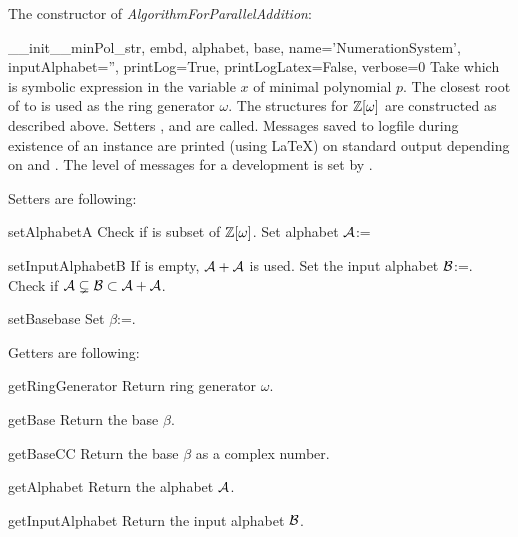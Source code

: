 The constructor of \emph{AlgorithmForParallelAddition}:
\begin{method}{\_\_init\_\_}{minPol\_str, embd, alphabet, base, name='NumerationSystem', inputAlphabet='', printLog=True, printLogLatex=False, verbose=0}
Take  which is symbolic expression in the variable $x$ of minimal polynomial $p$. The closest root of   to  is used as the ring generator $\omega$. The structures for $\mathbb{Z}[\omega]$ are constructed as described above. Setters ,  and  are called. Messages saved to logfile during existence of an instance are printed (using \LaTeX) on standard output depending on  and . The level of messages for a development is set by . 
\end{method}

Setters are following:
\begin{method}{setAlphabet}{A}
Check if  is subset of $\mathbb{Z}[\omega]$. Set alphabet $\mathcal{A}$:=
\end{method}

\begin{method}{setInputAlphabet}{B}
If  is empty, $\mathcal{A}+\mathcal{A}$ is used. Set the input alphabet $\mathcal{B}$:=. Check if $\mathcal{A}\subsetneq\mathcal{B}\subset\mathcal{A}+\mathcal{A}$. 
\end{method}

\begin{method}{setBase}{base}
Set $\beta$:=.
\end{method}

Getters are following:
\begin{method}{getRingGenerator}{}
Return ring generator $\omega$.
\end{method}


\begin{method}{getBase}{}
Return the base $\beta$.
\end{method}


\begin{method}{getBaseCC}{}
Return the base $\beta$ as a complex number.
\end{method}


\begin{method}{getAlphabet}{}
Return the alphabet $\mathcal{A}$.
\end{method}


\begin{method}{getInputAlphabet}{}
Return the input alphabet $\mathcal{B}$.
\end{method}


